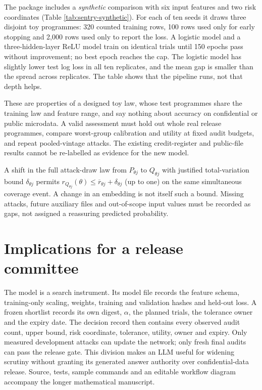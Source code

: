 \documentclass[10pt,a4paper]{article}
\theoremstyle{plain}
\begin{document}
The package includes a \emph{synthetic} comparison with six input features
and two risk coordinates (Table \ref{tab:sentry-synthetic}). For each of ten
seeds it draws three disjoint toy programmes: 320 counted training rows, 100
rows used only for early stopping and 2,000 rows used only to report the
loss. A logistic model and a three-hidden-layer ReLU model train on identical
trials until 150 epochs pass without improvement; no best epoch reaches the
cap. The logistic model has slightly lower test log loss in all ten
replicates, and the mean gap is smaller than the spread across replicates.
The table shows that the pipeline runs, not that depth helps.

These are properties of a designed toy law, whose test programmes share the
training law and feature range, and say nothing about accuracy on
confidential or public microdata. A valid assessment must hold out
whole real release programmes, compare worst-group calibration and utility at
fixed audit budgets, and repeat pooled-vintage attacks. The existing
credit-register and public-file results cannot be re-labelled as evidence for
the new model.

A shift in the full attack-draw law from $P_{\theta j}$ to $Q_{\theta j}$
with justified total-variation bound $\delta_{\theta j}$ permits
$r_{Q_{\theta j}}(\theta)\leq\overline r_{\theta j}+\delta_{\theta j}$
(up to one) on the same simultaneous coverage event. A change in an embedding
is not itself such a bound. Missing attacks, future auxiliary files and
out-of-scope input values must be recorded as gaps, not assigned a reassuring
predicted probability.

\section{Implications for a release committee}

The model is a search instrument. Its model file records the feature schema,
training-only scaling, weights, training and validation hashes and held-out
loss. A frozen shortlist records its own digest, $\alpha$, the planned trials,
the tolerance owner and the expiry date. The decision record then contains
every observed audit count, upper bound, risk coordinate, tolerance, utility,
owner and expiry. Only measured development attacks can update the
network; only fresh final audits can pass the release gate. This division makes
an LLM useful for widening scrutiny without granting its generated answer
authority over confidential-data release. Source, tests, sample commands and
an editable workflow diagram accompany the longer mathematical manuscript.
\end{document}

